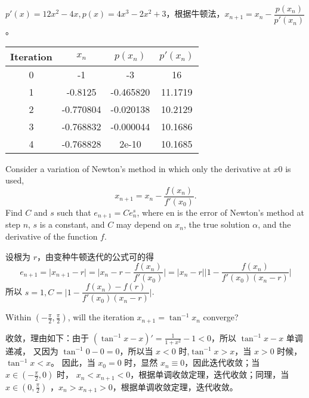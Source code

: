 \documentclass[lang=cn,a4paper,newtx,bibend=bibtex]{elegantpaper}
\begin{document}
\begin{solution}
    $p'(x) = 12x^2-4x, p(x) = 4x^3 - 2x^2 + 3$，根据牛顿法，$x_{n+1}=x_n-\dfrac{p(x_n)}{p'(x_n)}$。

    \begin{center}
        \begin{tabular}{|c|c|c|c|}
        \hline
        Iteration & \(x_n\) & \(p(x_n)\) & \(p'(x_n)\) \\
        \hline
        0 & -1 & -3 & 16 \\
        1 & -0.8125 & -0.465820 & 11.1719 \\
        2 & -0.770804 & -0.020138 & 10.2129 \\
        3 & -0.768832 & -0.000044 & 10.1686 \\
        4 & -0.768828 & 2e-10 & 10.1685 \\
        \hline
        \end{tabular}
    \end{center}          
\end{solution}
    
\begin{prob}[1.8.1-\textrm{IV}.]
    Consider a variation of Newton’s method in which only
    the derivative at $x0$ is used,
    \[
    x_{n+1}=x_n-\frac{f(x_n)}{f'(x_0)}.
    \] 
    Find $C$ and $s$ such that $e_{n+1}=Ce_n^s$, 
    where en is the error of Newton’s method at step $n$, $s$ is
    a constant, and $C$ may depend on $x_n$, the true solution
    $\alpha$, and the derivative of the function $f$.
\end{prob}
        
\begin{solution}
设根为 $r$，由变种牛顿迭代的公式可的得
\[
e_{n+1}=\vert x_{n+1}-r\vert = \vert x_{n}-r-\dfrac{f(x_n)}{f'(x_0)} \vert = \vert x_n-r\vert \bigg\vert 1-\dfrac{f(x_n)}{f'(x_0)(x_n-r)}\bigg\vert    
\]
所以 $s=1,C=\bigg\vert 1-\dfrac{f(x_n)-f(r)}{f'(x_0)(x_n-r)}\bigg\vert$.
\end{solution}

\begin{prob}[1.8.1-\textrm{V}.]
    Within $(-\frac{\pi}2,\frac{\pi}2)$, will the iteration
    $x_{n+1}=\tan^{-1}x_n$ converge?
\end{prob}
        
\begin{solution}
收敛，理由如下：由于 $(\tan^{-1}x - x)'=\frac{1}{1+x^2}-1 < 0$，所以 $\tan^{-1}x -x$ 单调递减，
又因为 $\tan^{-1}0 - 0 = 0$，所以当 $x<0$ 时,$\tan^{-1}x > x$，当 $x>0$ 时候，$\tan^{-1}x < x$。
因此，当 $x_0 = 0$ 时，显然 $x_n\equiv 0$，因此迭代收敛；当 $x\in(-\frac{\pi}{2},0)$ 时，
$x_n < x_{n+1} < 0$，根据单调收敛定理，迭代收敛；同理，当 $x\in(0,\frac{\pi}{2})$ 
，$x_n > x_{n+1} > 0$，根据单调收敛定理，迭代收敛。
\end{solution}
\end{document}
